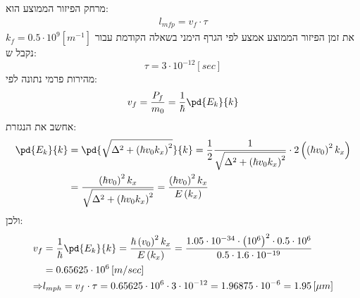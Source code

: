 \documentclass{article}
\begin{document}
\begin{Answer}
מרחק הפיזור הממוצע הוא:
\begin{align}\label{מרחק פיזור ממוצע}
    l_{mfp}=v_{f}\cdot\tau
\end{align}
את זמן הפיזור הממוצע אמצע לפי הגרף הימני בשאלה הקודמת עבור $k_{f}=0.5\cdot10^{9}\left[ m^{-1} \right]$ נקבל ש:
$$\tau=3\cdot10^{-12}\left[ sec \right]$$
מהירות פרמי נתונה לפי:
$$v_{f}=\frac{P_{f}}{m_{0}}=\frac{1}{\hbar}\pd{E_{k}}{k}$$
אחשב את הנגזרת:
\begin{align*}
    \pd{E_{k}}{k}&=\pd{\sqrt{\Delta^{2}+\left( \hbar v_{0}k_{x} \right)^{2}}}{k}=
    \frac{1}{2}\frac{1}{\sqrt{\Delta^{2}+\left( \hbar v_{0}k_{x} \right)^{2}}}\cdot2\left( \left( \hbar v_{0} \right)^{2}k_{x} \right)\\
    &=\frac{\left( \hbar v_{0} \right)^{2}k_{x}}{\sqrt{\Delta^{2}+\left( \hbar v_{0}k_{x} \right)^{2}}}=
    \frac{\left( \hbar v_{0} \right)^{2}k_{x}}{E\left( k_{x} \right)}
\end{align*}
ולכן:
\begin{align*}
    v_{f}&=\frac{1}{\hbar}\pd{E_{k}}{k}=
    \frac{ \hbar\left( v_{0} \right)^{2}k_{x}}{E\left( k_{x} \right)}=\frac{1.05\cdot10^{-34}\cdot\left( 10^{6} \right)^{2}\cdot0.5\cdot10^{6}}{0.5\cdot1.6\cdot10^{-19}}\\&=0.65625\cdot10^{6}\left[ m/sec \right]\\
    \Rightarrow& l_{mph}=v_{f}\cdot\tau=0.65625\cdot10^{6}\cdot 3\cdot10^{-12} = 1.96875 \cdot 10^{-6}=1.95\left[ \mu m \right]
\end{align*}
\end{Answer}
\end{document}
